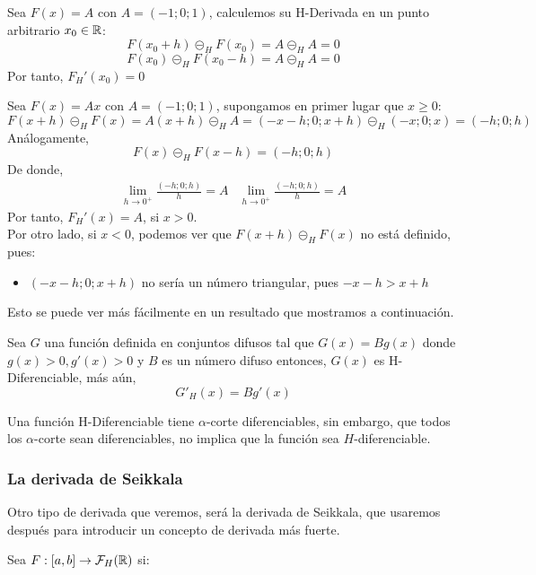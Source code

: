 \begin{ejemplo}
	Sea $F(x)=A$ con $A=(-1;0;1)$, calculemos su H-Derivada en un punto arbitrario $x_0 \in \mathbb R$: 
	\[
		F(x_0 + h) \circleddash_H F(x_0) = A \circleddash_H A = 0
	\]
	\[
		F(x_0) \circleddash_H F(x_0 - h) = A \circleddash_H A = 0
	\]
	Por tanto, $F_H'(x_0) = 0$
\end{ejemplo}

\begin{ejemplo}
	Sea $F(x)=A x$ con $A=(-1; 0; 1)$, supongamos en primer lugar que $x \geq 0$:
	\[
		F(x + h) \circleddash_H F(x) = A(x + h) \circleddash_H A = (-x - h; 0; x+h) \circleddash_H (-x; 0; x) = (-h; 0; h)
	\]
	Análogamente, 
	\[
		F(x) \circleddash_H F(x - h) = (-h; 0; h)
	\]
	De donde,
	\[
	\begin{array}{c||c}
		\lim\limits_{h \rightarrow 0^+} \frac{(-h; 0; h)}{h}=A & \lim\limits_{h \rightarrow 0^+} \frac{(-h; 0; h)}{h}=A
	\end{array}
	\]
	Por tanto, $F_H'(x) = A $, si $x > 0$. \\
	Por otro lado, si $x<0$, podemos ver que $F(x+h) \circleddash_H F(x)$ no está definido, pues:
	
	\begin{itemize}
		\item $(-x-h; 0; x+h)$ no sería un número triangular, pues $-x-h > x+h$
	\end{itemize}

	Esto se puede ver más fácilmente en un resultado que mostramos a continuación.
\end{ejemplo}

\begin{proposicion}
	Sea $G$ una función definida en conjuntos difusos tal que $G(x)=B g(x)$ donde $g(x)>0, g'(x)>0$ y $B$ es un número difuso entonces, $G(x)$ es H-Diferenciable, más aún, 
	\[
		G'_H(x) = B g'(x)
	\]
\end{proposicion}

Una función H-Diferenciable tiene $\alpha$-corte diferenciables, sin embargo, que todos los $\alpha$-corte sean diferenciables, no implica que la función sea $H$-diferenciable.

\subsubsection{La derivada de Seikkala}
Otro tipo de derivada que veremos, será la derivada de Seikkala, que usaremos después para introducir un concepto de derivada más fuerte.

\begin{definicion}
	Sea $F: [a, b] \rightarrow \mathcal{F}_H(\mathbb R)$ si:
\end{definicion}